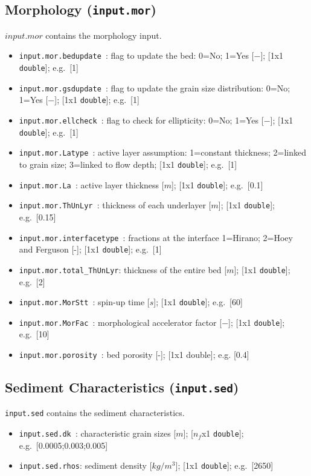 \documentclass[a4paper, 11pt]{article}
\begin{document}
\subsection{Morphology (\texttt{input.mor})}
\label{subsubsec:in_mor}
%
%
$input.mor$ contains the morphology input.
\begin{itemize}
\item \texttt{input.mor.bedupdate        }: flag to update the bed: 0=No; 1=Yes [$-$]; [1x1 \texttt{double}]; e.g.\ [1]
\item \texttt{input.mor.gsdupdate        }: flag to update the grain size distribution: 0=No; 1=Yes [$-$]; [1x1 \texttt{double}]; e.g.\ [1]
\item \texttt{input.mor.ellcheck        }: flag to check for ellipticity: 0=No; 1=Yes [$-$]; [1x1 \texttt{double}]; e.g.\ [1]
\item \texttt{input.mor.Latype        }: active layer assumption: 1=constant thickness; 2=linked to grain size; 3=linked to flow depth; [1x1 \texttt{double}]; e.g.\ [1]
\item \texttt{input.mor.La            }: active layer thickness [$m$]; [1x1 \texttt{double}]; e.g.\ [0.1]
\item \texttt{input.mor.ThUnLyr       }: thickness of each underlayer [$m$]; [1x1 \texttt{double}]; e.g.\ [0.15]
\item \texttt{input.mor.interfacetype    }: fractions at the interface 1=Hirano; 2=Hoey and Ferguson [-]; [1x1 \texttt{double}]; e.g.\ [1]
\item \texttt{input.mor.total\_ThUnLyr}: thickness of the entire bed [$m$]; [1x1 \texttt{double}]; e.g.\ [2]
\item \texttt{input.mor.MorStt        }: spin-up time [$s$]; [1x1 \texttt{double}]; e.g.\ [60]
\item \texttt{input.mor.MorFac        }: morphological accelerator factor [$-$]; [1x1 \texttt{double}]; e.g.\ [10]
\item \texttt{input.mor.porosity	}: bed porosity [-]; [1x1 double]; e.g. [0.4]
\end{itemize}

%
\subsection{Sediment Characteristics (\texttt{input.sed})}
\label{subsubsec:in_sed}
%
%
\texttt{input.sed} contains the sediment characteristics.
\begin{itemize}
\item \texttt{input.sed.dk  }: characteristic grain sizes [$m$]; [$n_f$x1 \texttt{double}]; e.g.\ [0.0005;0.003;0.005]
\item \texttt{input.sed.rhos}: sediment density [$kg/m^3$]; [1x1 \texttt{double}]; e.g.\ [2650]
\end{itemize}
%
\end{document}
